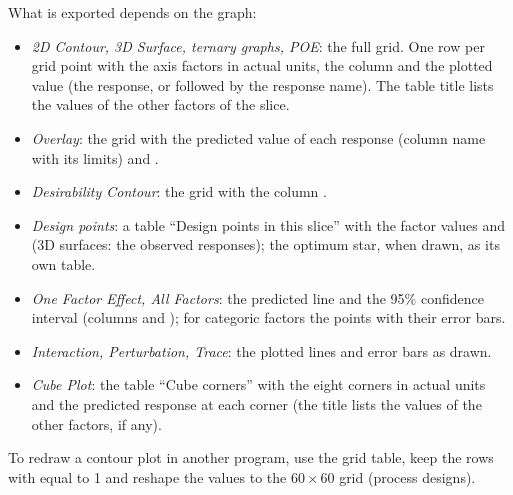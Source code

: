 What is exported depends on the graph:
\begin{itemize}
  \item \emph{2D Contour, 3D Surface, ternary graphs, POE}: the full grid. One row per grid point with the
        axis factors in actual units, the column  and the plotted value (the
        response, or  followed by the response name). The table title lists the values of the other
        factors of the slice.
  \item \emph{Overlay}: the grid with the predicted value of each response (column name with its limits)
        and .
  \item \emph{Desirability Contour}: the grid with the column .
  \item \emph{Design points}: a table ``Design points in this slice'' with the factor values and
         (3D surfaces: the observed responses); the optimum star, when drawn, as its own
        table.
  \item \emph{One Factor Effect, All Factors}: the predicted line and the 95\% confidence interval
        (columns  and ); for categoric factors the points with their error bars.
  \item \emph{Interaction, Perturbation, Trace}: the plotted lines and error bars as drawn.
  \item \emph{Cube Plot}: the table ``Cube corners'' with the eight corners in actual units and the
        predicted response at each corner (the title lists the values of the other factors, if any).
\end{itemize}
To redraw a contour plot in another program, use the grid table, keep the rows with
 equal to 1 and reshape the values to the $60\times60$ grid (process designs).
